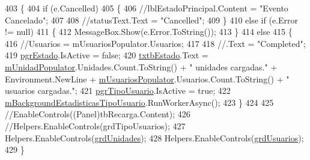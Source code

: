 \begin{DoxyCode}
403         \{
404             \textcolor{keywordflow}{if} (e.Cancelled)
405             \{
406                 \textcolor{comment}{//lblEstadoPrincipal.Content = "Evento Cancelado";}
407 
408                 \textcolor{comment}{//statusText.Text = "Cancelled";}
409             \}
410             \textcolor{keywordflow}{else} \textcolor{keywordflow}{if} (e.Error != null)
411             \{
412                 MessageBox.Show(e.Error.ToString());
413             \}
414             \textcolor{keywordflow}{else}
415             \{
416                 \textcolor{comment}{//Usuarios = mUsuariosPopulator.Usuarios;}
417 
418                 \textcolor{comment}{//.Text = "Completed";}
419                 \hyperlink{class_proyecto___integrador__3_1_1_reportes_1_1_reporte_frecuencia_de_uso_a40046fa9e14c98adb20dbc8f99f83842}{pgrEstado}.IsActive = \textcolor{keyword}{false};
420                 \hyperlink{class_proyecto___integrador__3_1_1_reportes_1_1_reporte_frecuencia_de_uso_ab5dad4dbd48cba1238ec0914d940c499}{txtbEstado}.Text = \hyperlink{class_proyecto___integrador__3_1_1_reportes_1_1_reporte_frecuencia_de_uso_a91106ba7bf23e61d729bc0399ef5fa98}{mUnidadPopulator}.Unidades.Count.ToString() + \textcolor{stringliteral}{"
       unidades cargadas."} + Environment.NewLine + \hyperlink{class_proyecto___integrador__3_1_1_reportes_1_1_reporte_frecuencia_de_uso_ad66e9ccc04488afa646ac2e65bf7db35}{mUsuariosPopulator}.Usuarios.Count.ToString() +
       \textcolor{stringliteral}{" usuarios cargadas."};
421                 \hyperlink{class_proyecto___integrador__3_1_1_reportes_1_1_reporte_frecuencia_de_uso_a6e3380fcd1c9e0e520f2867c8a98d9f0}{pgrTipoUsuario}.IsActive = \textcolor{keyword}{true};
422                 \hyperlink{class_proyecto___integrador__3_1_1_reportes_1_1_reporte_frecuencia_de_uso_a8d42c7455eb1b9669a3de163047f357f}{mBackgroundEstadisticasTipoUsuario}.RunWorkerAsync();
423             \}
424 
425             \textcolor{comment}{//EnableControls((Panel)tbRecarga.Content);}
426             \textcolor{comment}{//Helpers.EnableControls(grdTipoUsuarios);}
427             Helpers.EnableControls(\hyperlink{class_proyecto___integrador__3_1_1_reportes_1_1_reporte_frecuencia_de_uso_a0054ea7e45426e7bc4779c6d4e3144b8}{grdUnidades});
428             Helpers.EnableControls(\hyperlink{class_proyecto___integrador__3_1_1_reportes_1_1_reporte_frecuencia_de_uso_a559e1b9ac74bc2111e3d7c07400db096}{grdUsuarios});
429         \}
\end{DoxyCode}
